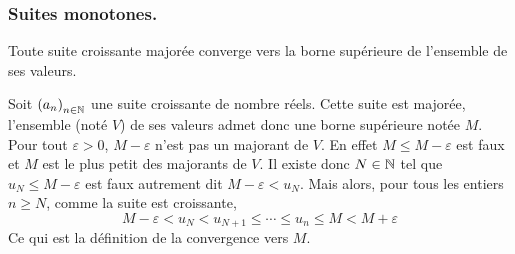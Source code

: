 \subsubsection{Suites monotones.}
\begin{thm}
 Toute suite croissante majorée converge vers la borne supérieure de l'ensemble de ses valeurs.
\end{thm}
\begin{demo}
Soit $\left( a_n\right) _{n\in \mathbb{N}}$ une suite croissante de nombre réels. Cette suite est majorée, l'ensemble (noté $V$) de ses valeurs admet donc une borne supérieure notée $M$.\newline
Pour tout $\varepsilon>0$, $M-\varepsilon$ n'est pas un majorant de $V$. En effet $M\leq M - \varepsilon$ est faux et $M$ est le plus petit des majorants de $V$. Il existe donc $N \in \mathbb{N}$ tel que $u_N\leq M - \varepsilon$ est faux autrement dit $M-\varepsilon < u_N$.
Mais alors, pour tous les entiers $n\geq N$, comme la suite est croissante,
\begin{displaymath}
 M-\varepsilon < u_N < u_{N+1}\leq \cdots \leq u_n \leq M < M + \varepsilon
\end{displaymath}
 Ce qui est la définition de la convergence vers $M$.
\end{demo}


